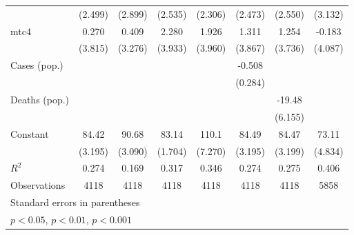 \documentclass{article}
\begin{document}
{\begin{longtable}{l*{7}{c}}
                &  (2.499)         &  (2.899)         &  (2.535)         &  (2.306)         &  (2.473)         &  (2.550)         &  (3.132)         \\
mtc4            &    0.270         &    0.409         &    2.280         &    1.926         &    1.311         &    1.254         &   -0.183         \\
                &  (3.815)         &  (3.276)         &  (3.933)         &  (3.960)         &  (3.867)         &  (3.736)         &  (4.087)         \\
Cases (pop.)    &                  &                  &                  &                  &   -0.508         &                  &                  \\
                &                  &                  &                  &                  &  (0.284)         &                  &                  \\
Deaths (pop.)   &                  &                  &                  &                  &                  &   -19.48\sym{**} &                  \\
                &                  &                  &                  &                  &                  &  (6.155)         &                  \\
Constant        &    84.42\sym{***}&    90.68\sym{***}&    83.14\sym{***}&    110.1\sym{***}&    84.49\sym{***}&    84.47\sym{***}&    73.11\sym{***}\\
                &  (3.195)         &  (3.090)         &  (1.704)         &  (7.270)         &  (3.195)         &  (3.199)         &  (4.834)         \\
\hline
\(R^{2}\)       &    0.274         &    0.169         &    0.317         &    0.346         &    0.274         &    0.275         &    0.406         \\
Observations    &     4118         &     4118         &     4118         &     4118         &     4118         &     4118         &     5858         \\
\hline\hline
\multicolumn{8}{l}{\footnotesize Standard errors in parentheses}\\
\multicolumn{8}{l}{\footnotesize \sym{*} \(p<0.05\), \sym{**} \(p<0.01\), \sym{***} \(p<0.001\)}\\
\end{longtable}
}
\end{document}
